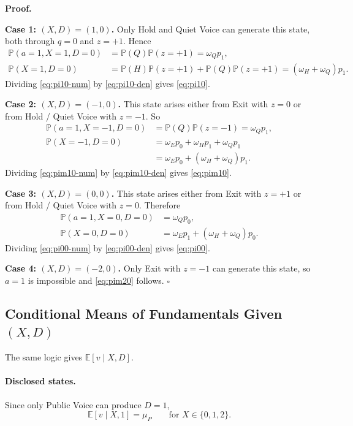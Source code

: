\documentclass[11pt,a4paper]{article}
\theoremstyle{definition}
\theoremstyle{plain}
\theoremstyle{remark}
\newcommand{\E}{\mathbb{E}}
\newcommand{\PP}{\mathbb{P}}
\newcommand{\1}{\mathbf{1}}
\begin{document}
\textbf{Proof.}

\textbf{Case 1: $(X,D)=(1,0)$.}
Only Hold and Quiet Voice can generate this state, both through $q=0$ and $z=+1$. Hence
\begin{align}
\PP(a=1,X=1,D=0)
&=
\PP(Q)\PP(z=+1)
=
\omega_Q p_1,
\label{eq:pi10-num}
\\
\PP(X=1,D=0)
&=
\PP(H)\PP(z=+1)+\PP(Q)\PP(z=+1)
=
(\omega_H+\omega_Q)p_1.
\label{eq:pi10-den}
\end{align}
Dividing \eqref{eq:pi10-num} by \eqref{eq:pi10-den} gives \eqref{eq:pi10}.

\textbf{Case 2: $(X,D)=(-1,0)$.}
This state arises either from Exit with $z=0$ or from Hold / Quiet Voice with $z=-1$. So
\begin{align}
\PP(a=1,X=-1,D=0)
&=
\PP(Q)\PP(z=-1)
=
\omega_Q p_1,
\label{eq:pim10-num}
\\
\PP(X=-1,D=0)
&=
\omega_E p_0 + \omega_H p_1 + \omega_Q p_1
\nonumber\\
&=
\omega_E p_0 + (\omega_H+\omega_Q)p_1.
\label{eq:pim10-den}
\end{align}
Dividing \eqref{eq:pim10-num} by \eqref{eq:pim10-den} gives \eqref{eq:pim10}.

\textbf{Case 3: $(X,D)=(0,0)$.}
This state arises either from Exit with $z=+1$ or from Hold / Quiet Voice with $z=0$. Therefore
\begin{align}
\PP(a=1,X=0,D=0)
&=
\omega_Q p_0,
\label{eq:pi00-num}
\\
\PP(X=0,D=0)
&=
\omega_E p_1 + (\omega_H+\omega_Q)p_0.
\label{eq:pi00-den}
\end{align}
Dividing \eqref{eq:pi00-num} by \eqref{eq:pi00-den} gives \eqref{eq:pi00}.

\textbf{Case 4: $(X,D)=(-2,0)$.}
Only Exit with $z=-1$ can generate this state, so $a=1$ is impossible and \eqref{eq:pim20} follows.
\hfill$\square$

\subsection{Conditional Means of Fundamentals Given \texorpdfstring{$(X,D)$}{(X,D)}}

The same logic gives $\E[v\mid X,D]$.

\paragraph{Disclosed states.}
Since only Public Voice can produce $D=1$,
\begin{equation}
\E[v\mid X,1]=\mu_P
\qquad
\text{for } X\in\{0,1,2\}.
\label{eq:Ev-disclosed}
\end{equation}
\end{document}

